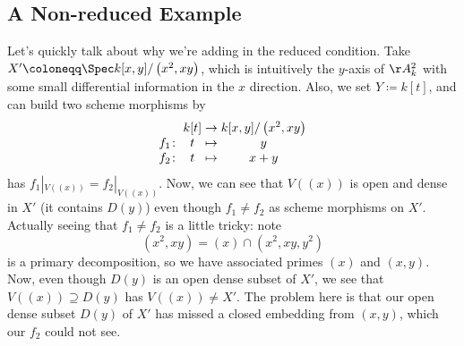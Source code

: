 \documentclass[../notes.tex]{subfiles}
\begin{document}
\subsection{A Non-reduced Example}
Let's quickly talk about why we're adding in the reduced condition. Take $X'\coloneqq\Spec k[x,y]/\left(x^2,xy\right)$, which is intuitively the $y$-axis of $\AA^2_k$ with some small differential information in the $x$ direction. Also, we set $Y\coloneqq k[t]$, and can build two scheme morphisms by
\[\arraycolsep=1.4pt\begin{array}{cccc}
	& k[t] &\to& k[x,y]/\left(x^2,xy\right) \\
	f_1\colon & t &\mapsto& y  \\
	f_2\colon & t &\mapsto& x+y
\end{array}\]
has $f_1|_{V((x))}=f_2|_{V((x))}$. Now, we can see that $V((x))$ is open and dense in $X'$ (it contains $D(y)$) even though $f_1\ne f_2$ as scheme morphisms on $X'$. Actually seeing that $f_1\ne f_2$ is a little tricky: note
\[\left(x^2,xy\right)=(x)\cap\left(x^2,xy,y^2\right)\]
is a primary decomposition, so we have associated primes $(x)$ and $(x,y)$. Now, even though $D(y)$ is an open dense subset of $X'$, we see that $V((x))\supseteq D(y)$ has $V((x))\ne X'$. The problem here is that our open dense subset $D(y)$ of $X'$ has missed a closed embedding from $(x,y)$, which our $f_2$ could not see.
\end{document}
